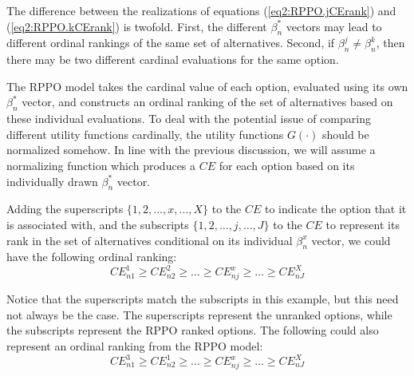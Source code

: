\documentclass[11pt,a4paper]{report}
\newcommand\CE{\ensuremath{\mathit{CE}}}    %
\begin{document}
The difference between the realizations of equations (\ref{eq2:RPPO.jCErank}) and (\ref{eq2:RPPO.kCErank}) is twofold.
First, the different $\beta_n^*$ vectors may lead to different ordinal rankings of the same set of alternatives.
Second, if $\beta_n^j \neq \beta_n^k$, then there may be two different cardinal evaluations for the same option.

The RPPO model takes the cardinal value of each option, evaluated using its own $\beta_n^*$  vector, and constructs an ordinal ranking of the set of alternatives based on these individual evaluations.
To deal with the potential issue of comparing different utility functions cardinally, the utility functions $G(\cdot)$ should be normalized somehow.{\footnotemark}
In line with the previous discussion, we will assume a normalizing function which produces a {\CE} for each option based on its individually drawn $\beta_n^*$ vector.

\addtocounter{footnote}{-1}

Adding the superscripts $\{1,2,\ldots,x,\ldots,X\}$  to the {\CE} to indicate the option that it is associated with, and the subscripts $\{1,2,\ldots,j,\ldots,J\}$ to the {\CE} to represent its rank in the set of alternatives conditional on its individual $\beta_n^x$ vector, we could have the following ordinal ranking:
\begin{equation}
	\label{eq2:RPPO.CErank.f}
	{\CE}^1_{n1} \geq {\CE}^2_{n2} \geq \ldots \geq {\CE}^x_{nj} \geq \ldots \geq {\CE}^X_{nJ}
\end{equation}

Notice that the superscripts match the subscripts in this example, but this need not always be the case.
The superscripts represent the unranked options, while the subscripts represent the RPPO ranked options.
The following could also represent an ordinal ranking from the RPPO model:
\begin{equation}
	\label{eq2:RPPO.CErank.a}
	{\CE}^3_{n1} \geq {\CE}^1_{n2} \geq \ldots \geq {\CE}^x_{nj} \geq \ldots \geq {\CE}^X_{nJ}
\end{equation}
\end{document}
